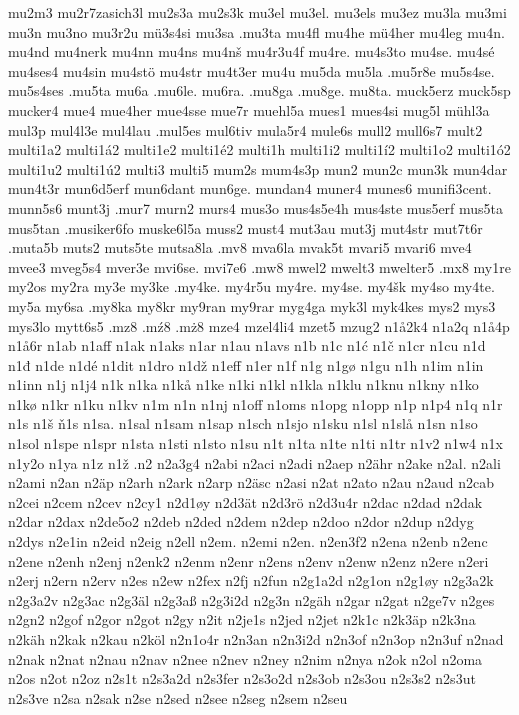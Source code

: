{{mu2m3
mu2r7zasich3l
mu2s3a
mu2s3k
mu3el
mu3el.
mu3els
mu3ez
mu3la
mu3mi
mu3n
mu3no
mu3r2u
mü3s4si
mu3sa
.mu3ta
mu4fl
mu4he
mü4her
mu4leg
mu4n.
mu4nd
mu4nerk
mu4nn
mu4ns
mu4nš
mu4r3u4f
mu4re.
mu4s3to
mu4se.
mu4sé
mu4ses4
mu4sin
mu4stö
mu4str
mu4t3er
mu4u
mu5da
mu5la
.mu5r8e
mu5s4se.
mu5s4ses
.mu5ta
mu6a
.mu6le.
mu6ra.
.mu8ga
.mu8ge.
mu8ta.
muck5erz
muck5sp
mucker4
mue4
mue4her
mue4sse
mue7r
muehl5a
mues1
mues4si
mug5l
mühl3a
mul3p
mul4l3e
mul4lau
.mul5es
mul6tiv
mula5r4
mule6s
mull2
mull6s7
mult2
multi1a2
multi1á2
multi1e2
multi1é2
multi1h
multi1i2
multi1í2
multi1o2
multi1ó2
multi1u2
multi1ú2
multi3
multi5
mum2s
mum4s3p
mun2
mun2c
mun3k
mun4dar
mun4t3r
mun6d5erf
mun6dant
mun6ge.
mundan4
muner4
munes6
munifi3cent.
munn5s6
munt3j
.mur7
murn2
murs4
mus3o
mus4s5e4h
mus4ste
mus5erf
mus5ta
mus5tan
.musiker6fo
muske6l5a
muss2
must4
mut3au
mut3j
mut4str
mut7t6r
.muta5b
muts2
muts5te
mutsa8la
.mv8
mva6la
mvak5t
mvari5
mvari6
mve4
mvee3
mveg5s4
mver3e
mvi6se.
mvi7e6
.mw8
mwel2
mwelt3
mwelter5
.mx8
my1re
my2os
my2ra
my3e
my3ke
.my4ke.
my4r5u
my4re.
my4se.
my4šk
my4so
my4te.
my5a
my6sa
.my8ka
my8kr
my9ran
my9rar
myg4ga
myk3l
myk4kes
mys2
mys3
mys3lo
mytt6s5
.mz8
.mź8
.mż8
mze4
mzel4li4
mzet5
mzug2
n1å2k4
n1a2q
n1å4p
n1å6r
n1ab
n1aff
n1ak
n1aks
n1ar
n1au
n1avs
n1b
n1c
n1ć
n1č
n1cr
n1cu
n1d
n1đ
n1de
n1dé
n1dit
n1dro
n1dž
n1eff
n1er
n1f
n1g
n1gø
n1gu
n1h
n1im
n1in
n1inn
n1j
n1j4
n1k
n1ka
n1kå
n1ke
n1ki
n1kl
n1kla
n1klu
n1knu
n1kny
n1ko
n1kø
n1kr
n1ku
n1kv
n1m
n1n
n1nj
n1off
n1oms
n1opg
n1opp
n1p
n1p4
n1q
n1r
n1s
n1š
ň1s
n1sa.
n1sal
n1sam
n1sap
n1sch
n1sjo
n1sku
n1sl
n1slå
n1sn
n1so
n1sol
n1spe
n1spr
n1sta
n1sti
n1sto
n1su
n1t
n1ta
n1te
n1ti
n1tr
n1v2
n1w4
n1x
n1y2o
n1ya
n1z
n1ž
.n2
n2a3g4
n2abi
n2aci
n2adi
n2aep
n2ähr
n2ake
n2al.
n2ali
n2ami
n2an
n2äp
n2arh
n2ark
n2arp
n2äsc
n2asi
n2at
n2ato
n2au
n2aud
n2cab
n2cei
n2cem
n2cev
n2cy1
n2d1øy
n2d3ät
n2d3rö
n2d3u4r
n2dac
n2dad
n2dak
n2dar
n2dax
n2de5o2
n2deb
n2ded
n2dem
n2dep
n2doo
n2dor
n2dup
n2dyg
n2dys
n2e1in
n2eid
n2eig
n2ell
n2em.
n2emi
n2en.
n2en3f2
n2ena
n2enb
n2enc
n2ene
n2enh
n2enj
n2enk2
n2enm
n2enr
n2ens
n2env
n2enw
n2enz
n2ere
n2eri
n2erj
n2ern
n2erv
n2es
n2ew
n2fex
n2fj
n2fun
n2g1a2d
n2g1on
n2g1øy
n2g3a2k
n2g3a2v
n2g3ac
n2g3äl
n2g3aß
n2g3i2d
n2g3n
n2gäh
n2gar
n2gat
n2ge7v
n2ges
n2gn2
n2gof
n2gor
n2got
n2gy
n2it
n2je1s
n2jed
n2jet
n2k1c
n2k3äp
n2k3na
n2käh
n2kak
n2kau
n2köl
n2n1o4r
n2n3an
n2n3i2d
n2n3of
n2n3op
n2n3uf
n2nad
n2nak
n2nat
n2nau
n2nav
n2nee
n2nev
n2ney
n2nim
n2nya
n2ok
n2ol
n2oma
n2os
n2ot
n2oz
n2s1t
n2s3a2d
n2s3fer
n2s3o2d
n2s3ob
n2s3ou
n2s3s2
n2s3ut
n2s3ve
n2sa
n2sak
n2se
n2sed
n2see
n2seg
n2sem
n2seu
}}
